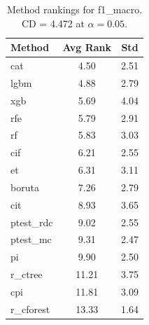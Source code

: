 \begin{table}[h]
\centering
\caption{Method rankings for f1_macro. CD = 4.472 at $\alpha=0.05$.}
\label{tab:ranks_f1_macro}
\begin{tabular}{lcc}
\toprule
Method & Avg Rank & Std \\
\midrule
cat & 4.50 & 2.51 \\
lgbm & 4.88 & 2.79 \\
xgb & 5.69 & 4.04 \\
rfe & 5.79 & 2.91 \\
rf & 5.83 & 3.03 \\
cif & 6.21 & 2.55 \\
et & 6.31 & 3.11 \\
boruta & 7.26 & 2.79 \\
cit & 8.93 & 3.65 \\
ptest_rdc & 9.02 & 2.55 \\
ptest_mc & 9.31 & 2.47 \\
pi & 9.90 & 2.50 \\
r_ctree & 11.21 & 3.75 \\
cpi & 11.81 & 3.09 \\
r_cforest & 13.33 & 1.64 \\
\bottomrule
\end{tabular}
\end{table}